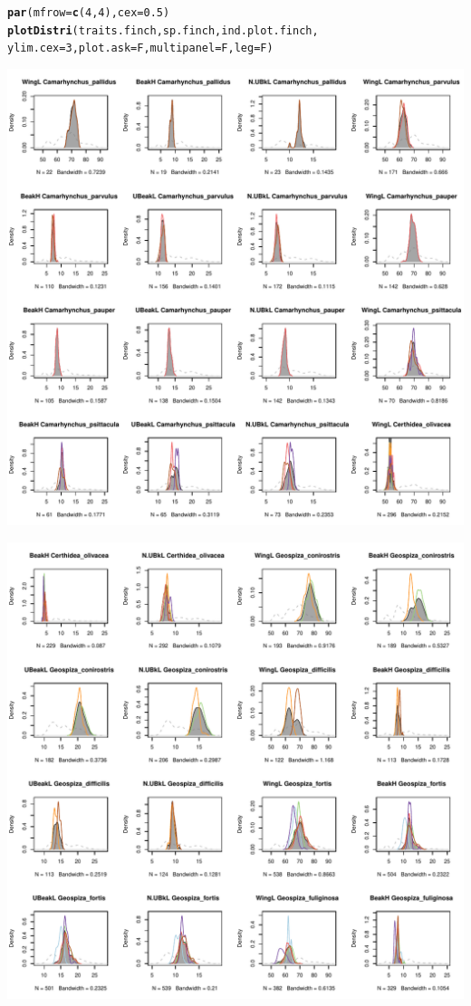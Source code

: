 \documentclass[12pt]{article}\usepackage[]{graphicx}\usepackage[]{color}
\makeatletter
\def\maxwidth{ %
  \ifdim\Gin@nat@width>\linewidth
    \linewidth
  \else
    \Gin@nat@width
  \fi
}
\newcommand{\hlnum}[1]{\textcolor[rgb]{0.686,0.059,0.569}{#1}}%
\newcommand{\hlstd}[1]{\textcolor[rgb]{0.345,0.345,0.345}{#1}}%
\newcommand{\hlkwc}[1]{\textcolor[rgb]{0.333,0.667,0.333}{#1}}%
\newcommand{\hlkwd}[1]{\textcolor[rgb]{0.737,0.353,0.396}{\textbf{#1}}}%
\newenvironment{kframe}{%
 \def\at@end@of@kframe{}%
 \ifinner\ifhmode%
  \def\at@end@of@kframe{\end{minipage}}%
  \begin{minipage}{\columnwidth}%
 \fi\fi%
 \def\FrameCommand##1{\hskip\@totalleftmargin \hskip-\fboxsep
 \colorbox{shadecolor}{##1}\hskip-\fboxsep
     \hskip-\linewidth \hskip-\@totalleftmargin \hskip\columnwidth}%
 \MakeFramed {\advance\hsize-\width
   \@totalleftmargin\z@ \linewidth\hsize
   \@setminipage}}%
 {\par\unskip\endMakeFramed%
 \at@end@of@kframe}
\newenvironment{knitrout}{}{} %
\makeatother
\begin{document}
\begin{knitrout}
\color{fgcolor}\begin{kframe}
\begin{alltt}
\hlkwd{par}\hlstd{(}\hlkwc{mfrow} \hlstd{=} \hlkwd{c}\hlstd{(}\hlnum{4}\hlstd{,}\hlnum{4}\hlstd{),} \hlkwc{cex} \hlstd{=} \hlnum{0.5}\hlstd{)}
\hlkwd{plotDistri}\hlstd{(traits.finch, sp.finch, ind.plot.finch,}
           \hlkwc{ylim.cex} \hlstd{=} \hlnum{3}\hlstd{,} \hlkwc{plot.ask} \hlstd{= F,} \hlkwc{multipanel} \hlstd{= F,} \hlkwc{leg} \hlstd{= F)}
\end{alltt}
\end{kframe}
\includegraphics[width=\maxwidth]{figure/unnamed-chunk-10-1} 

\includegraphics[width=\maxwidth]{figure/unnamed-chunk-10-2} 


\end{knitrout}
\end{document}
